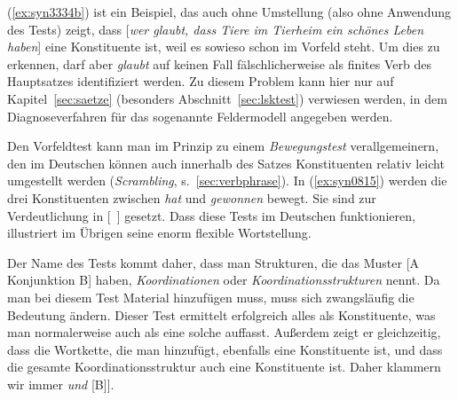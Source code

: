 (\ref{ex:syn3334b}) ist ein Beispiel, das auch ohne Umstellung (also ohne Anwendung des Tests) zeigt, dass [\textit{wer glaubt, dass Tiere im Tierheim ein schönes Leben haben}] eine Konstituente ist, weil es sowieso schon im Vorfeld steht.
Um dies zu erkennen, darf aber \textit{glaubt} auf keinen Fall fälschlicherweise als finites Verb des Hauptsatzes identifiziert werden.
Zu diesem Problem kann hier nur auf Kapitel~\ref{sec:saetze} (besonders Abschnitt~\ref{sec:lsktest}) verwiesen werden, in dem Diagnoseverfahren für das sogenannte Feldermodell angegeben werden.

Den Vorfeldtest kann man im Prinzip zu einem \textit{Bewegungstest} verallgemeinern, den im Deutschen können auch innerhalb des Satzes Konstituenten relativ leicht umgestellt werden (\textit{Scrambling}, s.\ \ref{sec:verbphrase}).
In (\ref{ex:syn0815}) werden die drei Konstituenten zwischen \textit{hat} und \textit{gewonnen} bewegt.
Sie sind zur Verdeutlichung in [~] gesetzt.
Dass diese Tests im Deutschen funktionieren, illustriert im Übrigen seine enorm flexible Wortstellung.

\begin{exe}
  \ex\label{ex:syn0815}
  \begin{xlist}
  \end{xlist}
\end{exe}


Der Name des Tests kommt daher, dass man Strukturen, die das Muster [A Konjunktion B] haben, \textit{Koordinationen} oder \textit{Koordinationsstrukturen} nennt.
Da man bei diesem Test Material hinzufügen muss, muss sich zwangsläufig die Bedeutung ändern.
Dieser Test ermittelt erfolgreich alles als Konstituente, was man normalerweise auch als eine solche auffasst.
Außerdem zeigt er gleichzeitig, dass die Wortkette, die man hinzufügt, ebenfalls eine Konstituente ist, und dass die gesamte Koordinationsstruktur auch eine Konstituente ist.
Daher klammern wir immer \zB [[A] \textit{und} [B]].

